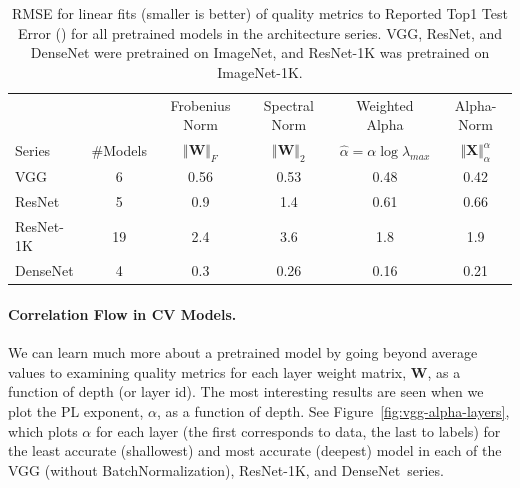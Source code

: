 \begin{table}[t]
\small
\begin{center}
\begin{tabular}{|p{1in}|c|c|c|c|c|}
\hline
   &    & Frobenius Norm & Spectral Norm & Weighted Alpha & Alpha-Norm \\
 Series & \#Models   & $\Vert\mathbf{W}\Vert_{F}$ & $\Vert\mathbf{W}\Vert_{2}$ & $\hat{\alpha}=\alpha\log\lambda_{max}$ & $\Vert\mathbf{X}\Vert^{\alpha}_{\alpha}$ \\
\hline
 VGG & 6 & 0.56 & 0.53 & 0.48 & 0.42  \\
 ResNet & 5 & 0.9 & 1.4 & 0.61 & 0.66  \\
 ResNet-1K & 19 & 2.4 & 3.6 & 1.8 & 1.9  \\
 DenseNet & 4 & 0.3 & 0.26 & 0.16 & 0.21 \\
\hline
\end{tabular}
\end{center}
\caption{RMSE for linear fits (smaller is better) of quality metrics to Reported Top1 Test Error (\cite{XXX-GIVE-REFS-AGAIN}) for all pretrained models in the architecture series.  VGG, ResNet, and DenseNet were pretrained on ImageNet, and ResNet-1K was pretrained on ImageNet-1K.  }
\label{table:cv-models}
\end{table}


\paragraph{Correlation Flow in CV Models.}

We can learn much more about a pretrained model by going beyond average values to examining quality metrics for each layer weight matrix, $\mathbf{W}$, as a function of depth (or layer id).  %
The most interesting results are seen when we plot the PL exponent, $\alpha$, as a function of depth.
%
See Figure~\ref{fig:vgg-alpha-layers}, which plots $\alpha$ for each layer (the first corresponds to data, the last to labels) for the least accurate (shallowest) and most accurate (deepest) model in each of the VGG (without BatchNormalization), ResNet-1K, and DenseNet~series.

